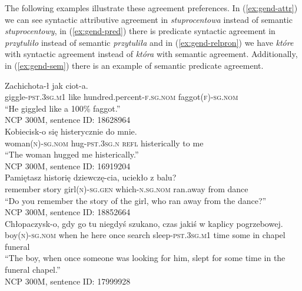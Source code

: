 The following examples illustrate these agreement preferences. In (\ref{ex:gend-attr}) we can see syntactic attributive agreement in \textsl{stuprocentowa} instead of semantic \textsl{stuprocentowy}, in (\ref{ex:gend-pred}) there is predicate syntactic agreement in \textsl{przytuliło} instead of semantic \textsl{przytuliła} and in (\ref{ex:gend-relpron}) we have \textsl{które} with syntactic agreement instead of \textsl{która} with semantic agreement. Additionally, in (\ref{ex:gend-sem}) there is an example of semantic predicate agreement.

\begin{exe}
  \ex
  \begin{xlist}
    \ex\label{ex:gend-attr}
    \gll Zachichota-ł jak  ciot-a.\\
    giggle\textsc{-pst.3sg.m1} like hundred.percent\textsc{-f.sg.nom} faggot\textsc{(f)-sg.nom}\\
    \glt ``He giggled like a 100\% faggot.''\\
    NCP 300M, sentence ID: 18628964\\

    \ex\label{ex:gend-pred}
    \gll Kobiecisk-o  się histerycznie do mnie.\\
    woman\textsc{(n)-sg.nom} hug\textsc{-pst.3sg.n} \textsc{refl} histerically to me\\
    \glt ``The woman hugged me histerically.''\\
    NCP 300M, sentence ID: 16919204\\

    \ex\label{ex:gend-relpron}
    \gll Pamiętasz historię dziewczę-cia,  uciekło z balu?\\
    remember story girl\textsc{(n)-sg.gen} which\textsc{-n.sg.nom} ran.away from dance\\
    \glt ``Do you remember the story of the girl, who ran away from the dance?''\\
    NCP 300M, sentence ID: 18852664\\

    \ex\label{ex:gend-sem}
    \gll Chłopaczysk-o, gdy go tu niegdyś szukano,  czas jakiś w kaplicy pogrzebowej.\\
    boy\textsc{(n)-sg.nom} when he here once search sleep\textsc{-pst.3sg.m1} time some in chapel funeral\\
    \glt ``The boy, when once someone was looking for him, slept for some time in the funeral chapel.''\\
    NCP 300M, sentence ID: 17999928
  \end{xlist}
\end{exe}


